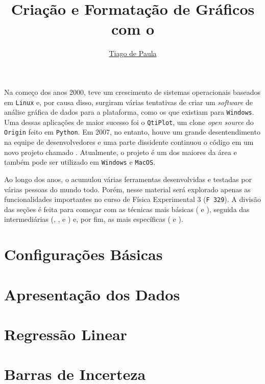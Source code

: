 \documentclass{article}
\title{Criação e Formatação de Gráficos com o}\softwarelogo
\author{\href{mailto:t187679@dac.unicamp.br}{Tiago de Paula}}
\date{}
\begin{document}
    \maketitle

    Na começo dos anos 2000, teve um crescimento de sistemas operacionais baseados em \texttt{Linux} e, por causa disso, surgiram várias tentativas de criar um \textit{software} de análise gráfica de dados para a plataforma, como os que existiam para \texttt{Windows}. Uma dessas aplicações de maior sucesso foi o \texttt{QtiPlot}, um clone \textit{open source} do \texttt{Origin} feito em \texttt{Python}. Em 2007, no entanto, houve um grande desentendimento na equipe de desenvolvedores e uma parte dissidente continuou o código em um novo projeto chamado \software. Atualmente, o projeto é um dos maiores da área e também pode ser utilizado em \texttt{Windows} e \texttt{MacOS}.

    Ao longo dos anos, o \software acumulou várias ferramentas desenvolvidas e testadas por várias pessoas do mundo todo. Porém, nesse material será explorado apenas as funcionalidades importantes no curso de Física Experimental 3 (\texttt{F 329}). A divisão das seções é feita para começar com as técnicas mais básicas ( e ), seguida das intermediárias (, ,  e ) e, por fim, as mais específicas ( e ).

    \section{Configurações Básicas} \label{sec:basico}

    \section{Apresentação dos Dados} \label{sec:reta}
        

    \section{Regressão Linear} \label{sec:regres}

    \section{Barras de Incerteza} \label{sec:incert}
\end{document}
